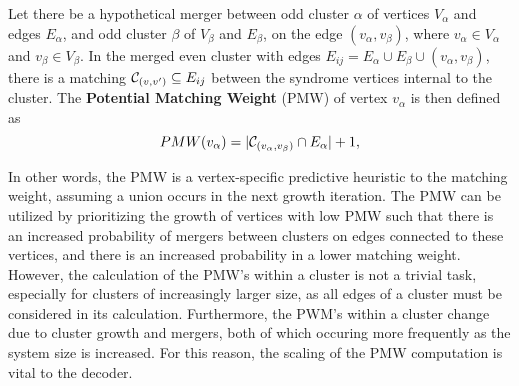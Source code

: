 \begin{definition}\label{def:pmw}
    Let there be a hypothetical merger between odd cluster $\alpha$ of vertices $V_\alpha$ and edges $E_\alpha$, and odd cluster $\beta$ of $V_\beta$ and $E_\beta$, on the edge $(v_\alpha, v_\beta)$, where $v_\alpha \in V_\alpha$ and $v_\beta \in V_\beta$. In the merged even cluster with edges $E_{ij} = E_\alpha \cup E_\beta \cup (v_\alpha, v_\beta)$, there is a matching $\mathcal{C}_{(v,v')} \subseteq E_{ij}$  between the syndrome vertices internal to the cluster. The \textbf{Potential Matching Weight} (PMW) of vertex $v_\alpha$ is then defined as
    \begin{equation}
      PMW(v_\alpha) = \lvert\mathcal{C}_{(v_\alpha,v_\beta)} \cap E_\alpha\rvert + 1,
    \end{equation}
\end{definition}

In other words, the PMW is a vertex-specific predictive heuristic to the matching weight, assuming a union occurs in the next growth iteration. The PMW can be utilized by prioritizing the growth of vertices with low PMW such that there is an increased probability of mergers between clusters on edges connected to these vertices, and there is an increased probability in a lower matching weight. However, the calculation of the PMW's within a cluster is not a trivial task, especially for clusters of increasingly larger size, as all edges of a cluster must be considered in its calculation. Furthermore, the PWM's within a cluster change due to cluster growth and mergers, both of which occuring more frequently as the system size is increased. For this reason, the scaling of the PMW computation is vital to the decoder. 

